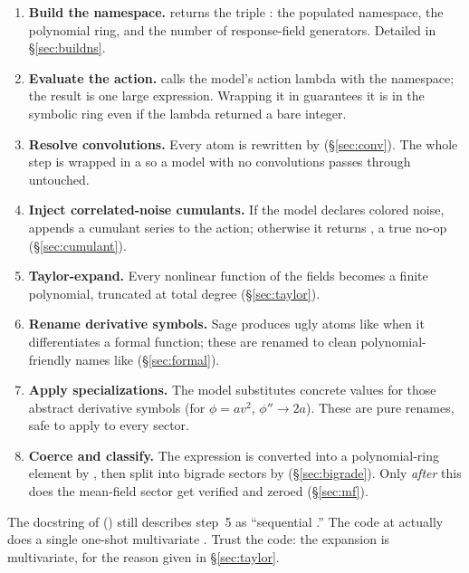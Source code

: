 \begin{enumerate}
  \item \textbf{Build the namespace.}  returns the triple
        : the populated namespace, the polynomial ring, and
        the number of response-field generators. Detailed in \S\ref{sec:buildns}.
  \item \textbf{Evaluate the action.}  calls the
        model's action lambda with the namespace; the result is one large 
        expression. Wrapping it in  guarantees it is in the symbolic
        ring even if the lambda returned a bare integer.
  \item \textbf{Resolve convolutions.} Every  atom is rewritten
        by  (\S\ref{sec:conv}). The whole step is
        wrapped in a  so a model with
        no convolutions passes through untouched.
  \item \textbf{Inject correlated-noise cumulants.} If the model declares colored
        noise,  appends a cumulant series to the
        action; otherwise it returns , a true no-op (\S\ref{sec:cumulant}).
  \item \textbf{Taylor-expand.} Every nonlinear function of the fields becomes a
        finite polynomial, truncated at total degree 
        (\S\ref{sec:taylor}).
  \item \textbf{Rename derivative symbols.} Sage produces ugly atoms like
         when it differentiates a formal function; these are
        renamed to clean polynomial-friendly names like 
        (\S\ref{sec:formal}).
  \item \textbf{Apply specializations.} The model substitutes concrete values for
        those abstract derivative symbols (for $\phi=a v^2$, $\phi''\to 2a$). These
        are pure renames, safe to apply to every sector.
  \item \textbf{Coerce and classify.} The  expression is converted into a
        polynomial-ring element by , then split into bigrade
        sectors by  (\S\ref{sec:bigrade}). Only \emph{after}
        this does the mean-field sector get verified and zeroed (\S\ref{sec:mf}).
\end{enumerate}

\begin{gotcha}
The docstring of  () still describes step~5
as ``sequential .'' The code at  actually
does a single one-shot multivariate . Trust the code: the expansion is
multivariate, for the reason given in \S\ref{sec:taylor}.
\end{gotcha}


